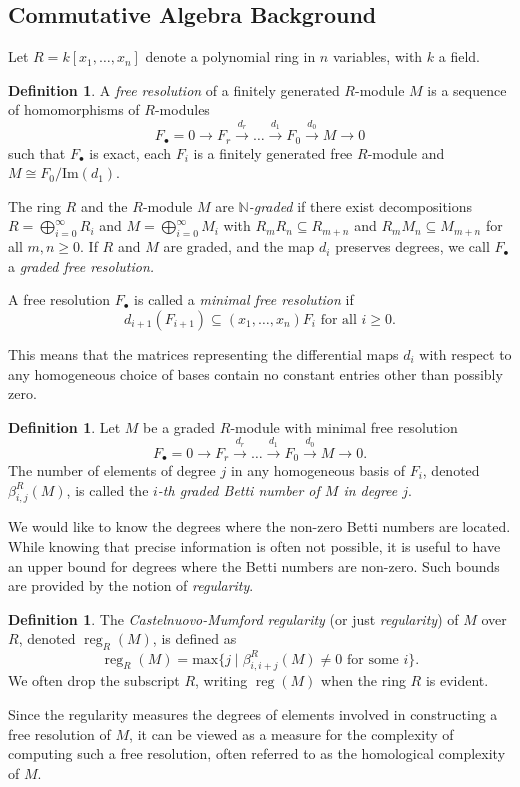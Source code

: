 \documentclass[11pt,letterpaper, reqno]{amsart}
\theoremstyle{definition}
\newtheorem{definition}[theorem]{Definition}
\theoremstyle{remark}
\DeclareMathOperator{\reg}{reg}
\numberwithin{equation}{section}
\begin{document}
\subsection{Commutative Algebra Background}
Let $R=k[x_1,\dots,x_n]$ denote a polynomial ring in $n$ variables, with $k$ a field. 
\begin{definition}
A \textit{free resolution} of a finitely generated $R$-module $M$ is a sequence of homomorphisms of $R$-modules
\[
F_\bullet = 0 \to F_r \xrightarrow{d_{r}} \ldots \xrightarrow{d_1} F_0 \xrightarrow{d_0} M \to 0
\]
such that $F_\bullet$ is exact, each $F_i$ is a finitely generated free $R$-module and  $M \cong F_0/\text{Im}(d_1)$.

The ring $R$ and the $R$-module $M$  are \textit{$\mathbb{N}$-graded} if there exist decompositions $R= \bigoplus_{i=0}^\infty R_i$  and  $M= \bigoplus_{i=0}^\infty M_i$ with $R_mR_n\subseteq R_{m+n}$ and  $R_mM_n\subseteq M_{m+n}$ for all $m,n\geq 0$. 
If $R$ and $M$ are graded, and the map $d_i$ preserves degrees, we call $F_\bullet$ a \textit{graded free resolution.}

A free resolution $F_\bullet$ is called a \textit{minimal free resolution} if 
\[
d_{i+1}(F_{i+1})\subseteq (x_1,\ldots,x_n)F_i \text{ for all } i\geq 0.
 \]
\end{definition}
This means that the matrices representing the differential maps $d_i$ with respect to any homogeneous choice of bases contain no constant entries other than possibly zero.
\begin{definition}
Let $M$ be a graded $R$-module with minimal free resolution
\[
F_\bullet = 0 \to F_r \xrightarrow{d_{r}} \ldots \xrightarrow{d_1} F_0 \xrightarrow{d_0} M \to 0.
\]
The number of elements of degree $j$ in  any homogeneous basis of $F_i$, denoted $\beta^R_{i,j}(M)$, is called the {\em $i$-th graded Betti number of $M$ in  degree $j$}.
\end{definition}
We would like to know the degrees where the non-zero Betti numbers are located. While knowing that precise information is often not possible, it is useful to have an upper bound for degrees where the Betti numbers are non-zero. Such bounds are provided by the notion of \textit{regularity}.
\begin{definition}
The \textit{Castelnuovo-Mumford regularity} (or just \textit{regularity}) of  $M$ over $R$, denoted $\reg_R(M)$, is defined as
\[
\reg_R(M)=\text{max}\{j\mid \beta_{i,i+j}^R(M)\neq 0 \text{ for some $i$}\}.
\]
We often drop the subscript $R$, writing $\reg(M)$ when the ring $R$ is evident.
\end{definition}  
Since the regularity measures the degrees of elements involved in constructing a free resolution of $M$, it can be viewed as a measure for the complexity of computing such a free resolution, often referred to as the homological complexity of $M$. 
\end{document}
